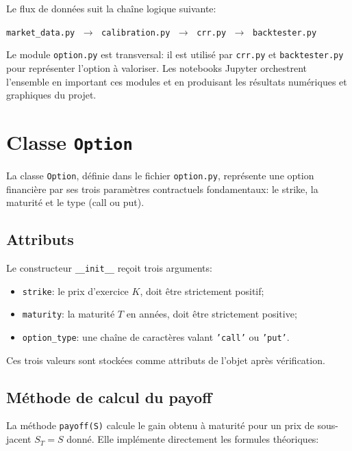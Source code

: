 \documentclass[11pt]{report}
\begin{document}
Le flux de données suit la chaîne logique suivante:

\begin{center}
\texttt{market\_data.py}
$\;\longrightarrow\;$
\texttt{calibration.py}
$\;\longrightarrow\;$
\texttt{crr.py}
$\;\longrightarrow\;$
\texttt{backtester.py}
\end{center}

Le module \texttt{option.py} est transversal: il est utilisé par \texttt{crr.py} 
et \texttt{backtester.py} pour représenter l'option à valoriser. Les notebooks Jupyter orchestrent l'ensemble en important ces modules et en produisant les résultats numériques et graphiques du projet.

\section{Classe \texttt{Option}}

La classe \texttt{Option}, définie dans le fichier \texttt{option.py}, représente une option financière par ses trois paramètres contractuels fondamentaux: le strike, la maturité et le type (call ou put).

\subsection{Attributs}

Le constructeur \texttt{\_\_init\_\_} reçoit trois arguments:

\begin{itemize}
    \item \texttt{strike}: le prix d'exercice $K$, doit être strictement positif;
    \item \texttt{maturity}: la maturité $T$ en années, doit être strictement positive;
    \item \texttt{option\_type}: une chaîne de caractères valant \texttt{'call'} ou \texttt{'put'}.
\end{itemize}

Ces trois valeurs sont stockées comme attributs de l'objet après vérification.

\subsection{Méthode de calcul du payoff}

La méthode \texttt{payoff(S)} calcule le gain obtenu à maturité pour un prix de sous-jacent $S_T = S$ donné. Elle implémente directement les formules théoriques:
\end{document}
